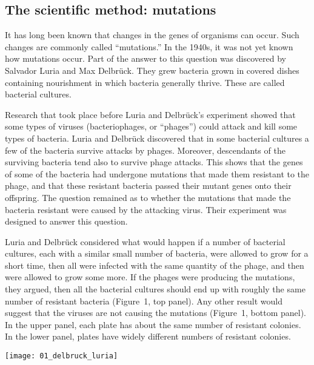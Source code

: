 \documentclass[12pt]{exam}
\begin{document}
\subsection*{The scientific method: mutations}

It has long been known that changes in the genes of organisms can occur.
Such changes are commonly called “mutations.” In the 1940s, it was not
yet known how mutations occur. Part of the answer to this question was
discovered by Salvador Luria and Max
Delbrück. They grew bacteria grown in covered dishes containing nourishment in which bacteria 
generally thrive. These are called bacterial cultures.

Research that took place before Luria and Delbrück's experiment 
showed that some types of viruses (bacteriophages, or “phages”) 
could attack and kill some types of bacteria. Luria and Delbrück discovered that in some bacterial cultures a few of
the bacteria survive attacks by phages. Moreover, descendants of the
surviving bacteria tend also to survive phage attacks. This shows that
the genes of some of the bacteria had undergone mutations that made them
resistant to the phage, and that these resistant bacteria passed their
mutant genes onto their offspring. The question remained as to whether the mutations that made the bacteria
resistant were caused by the attacking virus. Their experiment was designed to
answer this question.

Luria and Delbrück considered what would happen if a number 
of bacterial cultures, each with a similar small number of bacteria,
were allowed to grow for a short time, then all were infected with the
same quantity of the phage, and then were allowed to grow some more. If
the phages were producing the mutations, they argued, then all the
bacterial cultures should end up with roughly the same number of
resistant bacteria (Figure~1, top panel). Any other result would suggest that the viruses are
not causing the mutations (Figure~1, bottom panel). In the upper panel, each plate
has about the same number of resistant colonies. In the lower panel, plates have widely different
numbers of resistant colonies.

\medskip

{\centering\noindent\texttt{[image: 01\_delbruck\_luria]}\par
}

\end{document}
